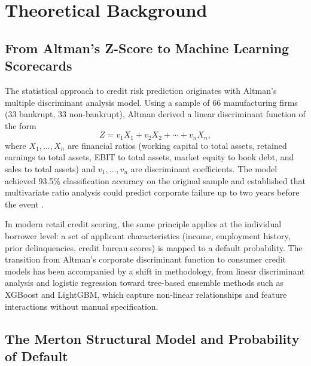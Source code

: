 \documentclass[11pt, a4paper]{article}
\begin{document}
\section{Theoretical Background}
\label{sec:theory}

\subsection{From Altman's Z-Score to Machine Learning Scorecards}

The statistical approach to credit risk prediction originates with Altman's \citeyear{altman1968} multiple discriminant analysis model. Using a sample of 66 manufacturing firms (33 bankrupt, 33 non-bankrupt), Altman derived a linear discriminant function of the form
\begin{equation}
\label{eq:altman_z}
Z = v_1 X_1 + v_2 X_2 + \cdots + v_n X_n,
\end{equation}
where $X_1, \ldots, X_n$ are financial ratios (working capital to total assets, retained earnings to total assets, EBIT to total assets, market equity to book debt, and sales to total assets) and $v_1, \ldots, v_n$ are discriminant coefficients. The model achieved 93.5\% classification accuracy on the original sample and established that multivariate ratio analysis could predict corporate failure up to two years before the event \parencite{altman1968}.

In modern retail credit scoring, the same principle applies at the individual borrower level: a set of applicant characteristics (income, employment history, prior delinquencies, credit bureau scores) is mapped to a default probability. The transition from Altman's corporate discriminant function to consumer credit models has been accompanied by a shift in methodology, from linear discriminant analysis and logistic regression toward tree-based ensemble methods such as XGBoost \parencite{chen2016xgboost} and LightGBM, which capture non-linear relationships and feature interactions without manual specification.

\subsection{The Merton Structural Model and Probability of Default}
\end{document}

